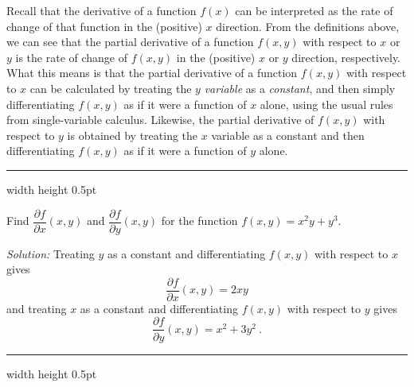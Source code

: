 
Recall that the derivative of a function $f(x)$ can be interpreted as the rate of change of that function in the
(positive) $x$ direction. 
From the definitions above, we can see that the partial derivative of a function $f(x,y)$ with respect to $x$ or $y$ is the rate of change of $f(x,y)$ in the (positive) $x$ or $y$ direction,
respectively. 
What this means is that the partial derivative of a function $f(x,y)$ with respect to $x$ can be
calculated by treating the $y$ \emph{variable} as a \emph{constant}, and then simply differentiating $f(x,y)$ as if it
were a function of $x$ alone, using the usual rules from single-variable calculus. 
Likewise, the partial derivative of
$f(x,y)$ with respect to $y$ is obtained by treating the $x$ variable as a constant and then differentiating $f(x,y)$
as if it were a function of $y$ alone.

\medskip
\hrule width \textwidth height 0.5pt
\begin{exmp}
 Find $\dfrac{\partial f}{\partial x} (x,y)$ and $\dfrac{\partial f}{\partial y} (x,y)$ for the function
 $f(x,y) = x^{2}y + y^3$.\smallskip
 \par\noindent\emph{Solution:} Treating $y$ as a constant and differentiating $f(x,y)$ with respect to $x$ gives
 \begin{displaymath}
  \dfrac{\partial f}{\partial x} (x,y) = 2xy
 \end{displaymath}
 and treating $x$ as a constant and differentiating $f(x,y)$ with respect to $y$ gives
 \begin{displaymath}
  \dfrac{\partial f}{\partial y} (x,y) = x^2 + 3y^2 ~.
 \end{displaymath}
\end{exmp}
\hrule width \textwidth height 0.5pt


